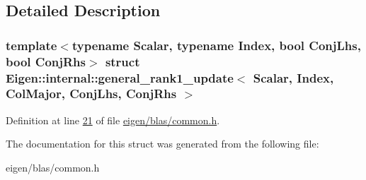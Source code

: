 \subsection{Detailed Description}
\subsubsection*{template$<$typename Scalar, typename Index, bool Conj\+Lhs, bool Conj\+Rhs$>$\newline
struct Eigen\+::internal\+::general\+\_\+rank1\+\_\+update$<$ Scalar, Index, Col\+Major, Conj\+Lhs, Conj\+Rhs $>$}



Definition at line \hyperlink{eigen_2blas_2common_8h_source_l00021}{21} of file \hyperlink{eigen_2blas_2common_8h_source}{eigen/blas/common.\+h}.



The documentation for this struct was generated from the following file\+:\begin{DoxyCompactItemize}
\item 
eigen/blas/common.\+h\end{DoxyCompactItemize}
